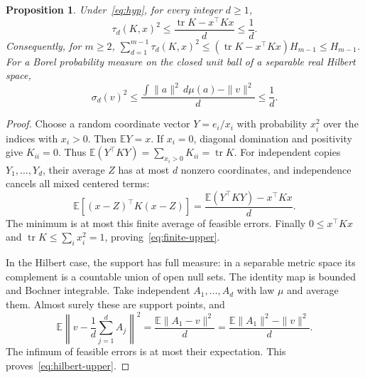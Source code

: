 \documentclass[11pt]{article}
\newtheorem{proposition}[theorem]{Proposition}
\newcommand{\E}{\mathbb E}
\begin{document}
\begin{proposition}\label{prop:sampling}
Under~\eqref{eq:hyp}, for every integer $d\geq1$,
\begin{equation}\label{eq:finite-upper}
 \tau_d(K,x)^2\leq\frac{\operatorname{tr}K-x^\top Kx}{d}\leq\frac1d.
\end{equation}
Consequently, for $m\geq2$,
$\sum_{d=1}^{m-1}\tau_d(K,x)^2
\leq(\operatorname{tr}K-x^\top Kx)H_{m-1}\leq H_{m-1}$.
For a Borel probability measure on the closed unit ball of a separable real
Hilbert space,
\begin{equation}\label{eq:hilbert-upper}
 \sigma_d(v)^2\leq
 \frac{\int\|a\|^2\,d\mu(a)-\|v\|^2}{d}\leq\frac1d.
\end{equation}
\end{proposition}
\begin{proof}
Choose a random coordinate vector $Y=e_i/x_i$ with probability $x_i^2$
over the indices with $x_i>0$. Then $\E Y=x$.
If $x_i=0$, diagonal domination and positivity give $K_{ii}=0$.
Thus $\E(Y^\top KY)=\sum_{x_i>0}K_{ii}=\operatorname{tr}K$.
For independent copies $Y_1,\ldots,Y_d$, their average $Z$ has at most
$d$ nonzero coordinates, and independence cancels all mixed centered terms:
\[
 \E[(x-Z)^\top K(x-Z)]
 =\frac{\E(Y^\top KY)-x^\top Kx}{d}.
\]
The minimum is at most this finite average of feasible errors.
Finally $0\leq x^\top Kx$ and
$\operatorname{tr}K\leq\sum_i x_i^2=1$, proving~\eqref{eq:finite-upper}.

In the Hilbert case, the support has full measure: in a separable metric
space its complement is a countable union of open null sets.
The identity map is bounded and Bochner integrable. Take independent
$A_1,\ldots,A_d$ with law $\mu$ and average them. Almost surely these
are support points, and
\[
 \E\left\|v-\frac1d\sum_{j=1}^d A_j\right\|^2
 =\frac{\E\|A_1-v\|^2}{d}
 =\frac{\E\|A_1\|^2-\|v\|^2}{d}.
\]
The infimum of feasible errors is at most their expectation.
This proves~\eqref{eq:hilbert-upper}.
\end{proof}
\end{document}
